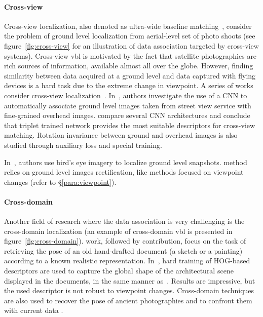 		\paragraph{Cross-view}
			\label{para:cross_view}
			Cross-view localization, also denoted as ultra-wide baseline matching~\citep{Bansal2012}, consider the problem of ground level localization from aerial-level set of photo shoots (see figure~\ref{fig:cross-view} for an illustration of data association targeted by cross-view systems). Cross-view \ac{vbl} is motivated by the fact that satellite photographies are rich sources of information, available almost all over the globe. However, finding similarity between data acquired at a ground level and data captured with flying devices is a hard task due to the extreme change in viewpoint. A series of works consider cross-view localization~\citep{Lin2013,Workman2015,Castaldo2015,Vo2016,Tian2017}. In~\citep{Workman2015,Vo2016}, authors investigate the use of a CNN to automatically associate ground level images taken from street view service with fine-grained overhead images. \citet{Vo2016} compare several CNN architectures and conclude that triplet trained network provides the most suitable descriptors for cross-view matching. Rotation invariance between ground and overhead images is also studied through auxiliary loss and special training. 
			
			In~\citep{Bansal2011,Bansal2012,Lin2015}, authors use bird's eye imagery to localize ground level snapshots. \citet{Bansal2011} method relies on ground level images rectification, like methods focused on viewpoint changes (refer to \S\ref{para:viewpoint}).
			
		\paragraph{Cross-domain}
			\label{para:cross_domain}
			Another field of research where the data association is very challenging is the cross-domain localization (an example of cross-domain \ac{vbl} is presented in figure~\ref{fig:cross-domain}). \citet{Russell2011} work, followed by \citet{Aubry2014} contribution, focus on the task of retrieving the pose of an old hand-drafted document (a sketch or a painting) according to a known realistic representation. In~\citep{Aubry2014}, hard training of HOG-based descriptors are used to capture the global shape of the architectural scene displayed in the documents, in the same manner as~\citep{Shrivastava2011}. Results are impressive, but the used descriptor is not robust to viewpoint changes. Cross-domain techniques are also used to recover the pose of ancient photographies and to confront them with current data \citep{Bae2010,Bhowmik2017}.